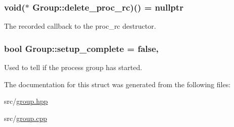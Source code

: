 \subsubsection[{\texorpdfstring{delete\+\_\+proc\+\_\+rc}{delete_proc_rc}}]{\setlength{\rightskip}{0pt plus 5cm}void($\ast$ Group\+::delete\+\_\+proc\+\_\+rc)() = nullptr\hspace{0.3cm}{\ttfamily [static]}}\hypertarget{struct_group_a737564dd9819ea8050f6f3019c550da2}{}\label{struct_group_a737564dd9819ea8050f6f3019c550da2}


The recorded callback to the proc\+\_\+rc destructor. 

\subsubsection[{\texorpdfstring{setup\+\_\+complete}{setup_complete}}]{\setlength{\rightskip}{0pt plus 5cm}bool Group\+::setup\+\_\+complete = false\hspace{0.3cm}{\ttfamily [static]}, {\ttfamily [private]}}\hypertarget{struct_group_a35632ca452cfe09fbf723539cd264f58}{}\label{struct_group_a35632ca452cfe09fbf723539cd264f58}


Used to tell if the process group has started. 



The documentation for this struct was generated from the following files\+:\begin{DoxyCompactItemize}
\item 
src/\hyperlink{group_8hpp}{group.\+hpp}\item 
src/\hyperlink{group_8cpp}{group.\+cpp}\end{DoxyCompactItemize}
